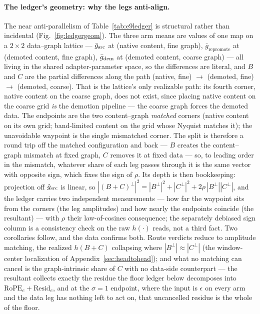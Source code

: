 \paragraph{The ledger's geometry: why the legs anti-align.}
The near anti-parallelism of Table~\ref{tab:e9ledger} is structural
rather than incidental (Fig.~\ref{fig:ledgergeom}). The three arm means are values of one map on a
$2 \times 2$ data--graph lattice — $\bar g_{\mathrm{src}}$ at (native
content, fine graph), $\bar g_{\mathrm{repromote}}$ at (demoted
content, fine graph), $\bar g_{\mathrm{dem}}$ at (demoted content, coarse
graph) — all living in the shared adapter-parameter space, so the
differences are literal, and $B$ and $C$ are the partial differences
along the path (native, fine) $\to$ (demoted, fine) $\to$ (demoted,
coarse). That is the lattice's only realizable path: its fourth
corner, native content on the coarse graph, does not exist, since
placing native content on the coarse grid \emph{is} the demotion
pipeline — the coarse graph forces the demoted data. The endpoints
are the two content--graph \emph{matched} corners (native content on
its own grid; band-limited content on the grid whose Nyquist matches
it); the unavoidable waypoint is the single mismatched corner. The
split is therefore a round trip off the matched configuration and
back — $B$ creates the content--graph mismatch at fixed graph, $C$
removes it at fixed data — so, to leading order in the mismatch,
whatever share of each leg passes through it is the same vector with
opposite sign, which fixes the sign of $\rho$. Its depth is then
bookkeeping: projection off $\hat g_{\mathrm{src}}$ is linear, so
$|(B{+}C)^{\perp}|^2 = |B^{\perp}|^2 + |C^{\perp}|^2
+ 2\rho\,|B^{\perp}||C^{\perp}|$, and the ledger carries two
independent measurements — how far the waypoint sits from the corners
(the leg amplitudes) and how nearly the endpoints coincide (the
resultant) — with $\rho$ their law-of-cosines consequence; the
separately debiased sign column is a consistency check on the raw
$h(\cdot)$ reads, not a third fact. Two corollaries follow, and the
data confirms both. Route verdicts reduce to amplitude matching, the
realized $h(B{+}C)$ collapsing where
$|B^{\perp}| \approx |C^{\perp}|$ (the window-center localization of
Appendix~\ref{sec:headtohead}); and what no matching can cancel is
the graph-intrinsic share of $C$ with no data-side counterpart — the
resultant collects exactly the residue the floor ledger below
decomposes into $\mathrm{RoPE}_e + \mathrm{Resid}_e$, and at the
$\sigma = 1$ endpoint, where the input is $\epsilon$ on every arm and
the data leg has nothing left to act on, that uncancelled residue is
the whole of the floor.

